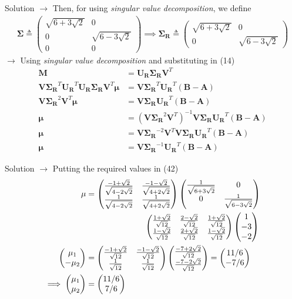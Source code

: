 \documentclass{beamer}
\numberwithin{equation}{section}
\theoremstyle{remark}
\newcommand{\myvec}[1]{\ensuremath{\begin{pmatrix}#1\end{pmatrix}}}
\let\vec\mathbf
\begin{document}
\begin{frame}{Solution}
$\longrightarrow$ Then, for using \textit{singular value decomposition}, we define
\begin{align}
\vec{\Sigma} \triangleq \myvec{\sqrt{6+3\sqrt{2}}&0\\0&\sqrt{6-3\sqrt{2}}\\0&0} \implies
\vec{\Sigma_R} \triangleq \myvec{\sqrt{6+3\sqrt{2}}&0\\0&\sqrt{6-3\sqrt{2}}}
\end{align}
$\rightarrow$ Using \textit{singular value decomposition} and substituting in (14)
\begin{align}
    \vec{M} &= \vec{U_R}\vec{\Sigma_R}\vec{V}^T \\
    \vec{V}\vec{\Sigma_R}^T\vec{U_R}^T\vec{U_R}\vec{\Sigma_R}\vec{V}^T\vec{\mu} &= \vec{V}\vec{\Sigma_R}^T\vec{U_R}^T(\vec{B}-\vec{A}) \\
    \vec{V}\vec{\Sigma_R}^2\vec{V}^T\vec{\mu} &= \vec{V}\vec{\Sigma_R}\vec{U_R}^T(\vec{B}-\vec{A}) \\
    \vec{\mu} &= (\vec{V}\vec{\Sigma_R}^2\vec{V}^T)^{-1}\vec{V}\vec{\Sigma_R}\vec{U_R}^T(\vec{B}-\vec{A}) \\
    \vec{\mu} &= \vec{V}\vec{\Sigma_R}^{-2}\vec{V}^T\vec{V}\vec{\Sigma_R}\vec{U_R}^T(\vec{B}-\vec{A}) \\
    \vec{\mu} &= \vec{V}\vec{\Sigma_R}^{-1}\vec{U_R}^T(\vec{B}-\vec{A})
\end{align}
\end{frame}

\begin{frame}{Solution}
$\rightarrow$ Putting the required values in (42)
\begin{align}
    \vec{\mu} &= \myvec{\frac{-1+\sqrt{2}}{\sqrt{4-2\sqrt{2}}}&\frac{-1-\sqrt{2}}{\sqrt{4+2\sqrt{2}}}\\\frac{1}{\sqrt{4-2\sqrt{2}}}&\frac{1}{\sqrt{4+2\sqrt{2}}}} \myvec{\frac{1}{\sqrt{6+3\sqrt{2}}}&0\\0&\frac{1}{\sqrt{6-3\sqrt{2}}}} \notag \\
    &\hspace{2.5cm}\myvec{\frac{1+\sqrt{2}}{\sqrt{12}}&\frac{2-\sqrt{2}}{\sqrt{12}}&\frac{1+\sqrt{2}}{\sqrt{12}}\\\frac{1-\sqrt{2}}{\sqrt{12}}&\frac{2+\sqrt{2}}{\sqrt{12}}&\frac{1-\sqrt{2}}{\sqrt{12}}} \myvec{1\\-3\\-2} \\
    \myvec{\mu_1\\-\mu_2} &= \myvec{\frac{-1+\sqrt{2}}{\sqrt{12}}&\frac{-1-\sqrt{2}}{\sqrt{12}}\\\frac{1}{\sqrt{12}}&\frac{1}{\sqrt{12}}} \myvec{\frac{-7+2\sqrt{2}}{\sqrt{12}}\\\frac{-7-2\sqrt{2}}{\sqrt{12}}} = \myvec{11/6\\-7/6} \\
    \implies \myvec{\mu_1\\\mu_2} &= \myvec{11/6\\7/6}
\end{align}
\end{frame}
\end{document}
